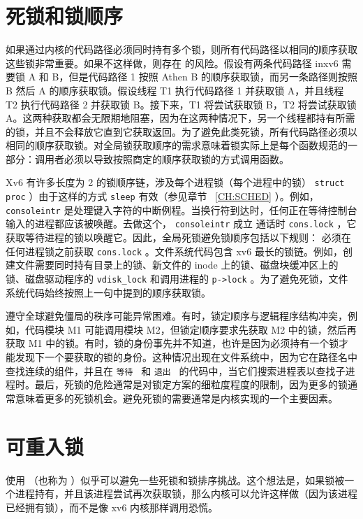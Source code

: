 \documentclass[UTF8]{article}
\begin{document}
    \section{死锁和锁顺序  }    如果通过内核的代码路径必须同时持有多个锁，则所有代码路径以相同的顺序获取这些锁非常重要。如果不这样做，则存在        的风险。假设有两条代码路径 inxv6 需要锁 A 和 B，但是代码路径 1 按照 Athen B 的顺序获取锁，而另一条路径则按照 B 然后 A 的顺序获取锁。假设线程 T1 执行代码路径 1 并获取锁 A，并且线程 T2 执行代码路径 2 并获取锁 B。接下来，T1 将尝试获取锁 B，T2 将尝试获取锁 A。这两种获取都会无限期地阻塞，因为在这两种情况下，另一个线程都持有所需的锁，并且不会释放它直到它获取返回。为了避免此类死锁，所有代码路径必须以相同的顺序获取锁。对全局锁获取顺序的需求意味着锁实际上是每个函数规范的一部分：调用者必须以导致按照商定的顺序获取锁的方式调用函数。  

Xv6 有许多长度为 2 的锁顺序链，涉及每个进程锁（每个进程中的锁）
    \lstinline{struct proc}    ）由于这样的方式
    \lstinline{sleep}    有效（参见章节~    \ref{CH:SCHED}    ）。例如，
    \lstinline{consoleintr}   
        是处理键入字符的中断例程。当换行符到达时，任何正在等待控制台输入的进程都应该被唤醒。去做这个，
    \lstinline{consoleintr}    成立
 通话时    \lstinline{cons.lock}   
        ，它获取等待进程的锁以唤醒它。因此，全局死锁避免锁顺序包括以下规则：
 必须在任何进程锁之前获取    \lstinline{cons.lock}   。文件系统代码包含 xv6 最长的锁链。例如，创建文件需要同时持有目录上的锁、新文件的 inode 上的锁、磁盘块缓冲区上的锁、磁盘驱动程序的    \lstinline{vdisk_lock}    和调用进程的    \lstinline{p->lock}    。为了避免死锁，文件系统代码始终按照上一句中提到的顺序获取锁。  

遵守全球避免僵局的秩序可能异常困难。有时，锁定顺序与逻辑程序结构冲突，例如，代码模块 M1 可能调用模块 M2，但锁定顺序要求先获取 M2 中的锁，然后再获取 M1 中的锁。有时，锁的身份事先并不知道，也许是因为必须持有一个锁才能发现下一个要获取的锁的身份。这种情况出现在文件系统中，因为它在路径名中查找连续的组件，并且在  {    \tt    等待   }  和  {    \tt    退出   }  的代码中，当它们搜索进程表以查找子进程时。最后，死锁的危险通常是对锁定方案的细粒度程度的限制，因为更多的锁通常意味着更多的死锁机会。避免死锁的需要通常是内核实现的一个主要因素。  

   \section{可重入锁  }     

使用       （也称为       ）似乎可以避免一些死锁和锁排序挑战。这个想法是，如果锁被一个进程持有，并且该进程尝试再次获取锁，那么内核可以允许这样做（因为该进程已经拥有锁），而不是像 xv6 内核那样调用恐慌。  
\end{document}
